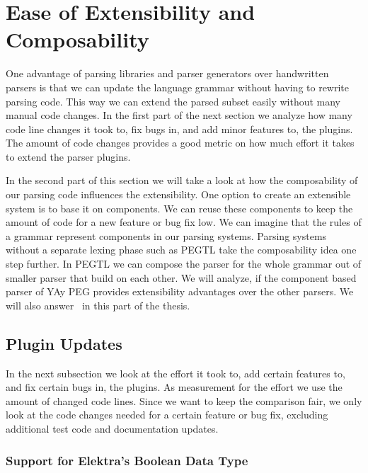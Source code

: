 \section{Ease of Extensibility and Composability}
\label{sec:extensibility}

One advantage of parsing libraries and parser generators over handwritten parsers is that we can update the language grammar without having to rewrite parsing code. This way we can extend the parsed  subset easily without many manual code changes. In the first part of the next section we analyze how many code line changes it took to, fix bugs in, and add minor features to, the  plugins. The amount of code changes provides a good metric on how much effort it takes to extend the parser plugins.

In the second part of this section we will take a look at how the composability of our parsing code influences the extensibility. One option to create an extensible system is to base it on components. We can reuse these components to keep the amount of code for a new feature or bug fix low. We can imagine that the rules of a grammar represent components in our parsing systems. Parsing systems without a separate lexing phase such as PEGTL take the composability idea one step further. In PEGTL we can compose the parser for the whole grammar out of smaller parser that build on each other. We will analyze, if the component based parser of YAy PEG provides extensibility advantages over the other parsers. We will also answer~ in this part of the thesis.

\closeness*

\subsection{Plugin Updates}

In the next subsection we look at the effort it took to, add certain features to, and fix certain bugs in, the  plugins. As measurement for the effort we use the amount of changed code lines. Since we want to keep the comparison fair, we only look at the code changes needed for a certain feature or bug fix, excluding additional test code and documentation updates.

\subsubsection{Support for Elektra’s Boolean Data Type}


